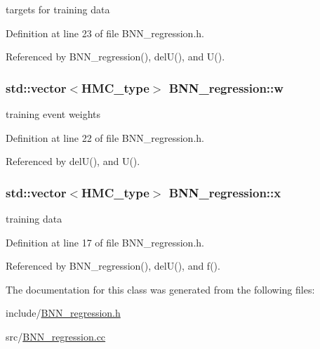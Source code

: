 targets for training data 



Definition at line 23 of file B\-N\-N\-\_\-regression.\-h.



Referenced by B\-N\-N\-\_\-regression(), del\-U(), and U().

\hypertarget{class_b_n_n__regression_a950982785131b5e7945742ef40dd5860}{
\subsubsection[{w}]{\setlength{\rightskip}{0pt plus 5cm}std\-::vector$<${\bf H\-M\-C\-\_\-type}$>$ B\-N\-N\-\_\-regression\-::w\hspace{0.3cm}{\ttfamily [private]}}}\label{class_b_n_n__regression_a950982785131b5e7945742ef40dd5860}


training event weights 



Definition at line 22 of file B\-N\-N\-\_\-regression.\-h.



Referenced by del\-U(), and U().

\hypertarget{class_b_n_n__regression_a81f1e9e60fc0c057a99687ec6be99c6e}{
\subsubsection[{x}]{\setlength{\rightskip}{0pt plus 5cm}std\-::vector$<${\bf H\-M\-C\-\_\-type}$>$ B\-N\-N\-\_\-regression\-::x\hspace{0.3cm}{\ttfamily [private]}}}\label{class_b_n_n__regression_a81f1e9e60fc0c057a99687ec6be99c6e}


training data 



Definition at line 17 of file B\-N\-N\-\_\-regression.\-h.



Referenced by B\-N\-N\-\_\-regression(), del\-U(), and f().



The documentation for this class was generated from the following files\-:\begin{DoxyCompactItemize}
\item 
include/\hyperlink{_b_n_n__regression_8h}{B\-N\-N\-\_\-regression.\-h}\item 
src/\hyperlink{_b_n_n__regression_8cc}{B\-N\-N\-\_\-regression.\-cc}\end{DoxyCompactItemize}
